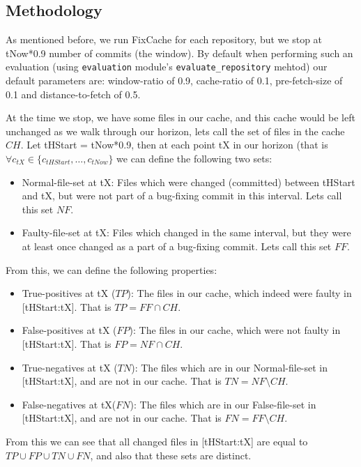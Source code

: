 \documentclass[12pt,twoside,notitlepage]{report}
\newcommand{\fxch}{FixCache}
\begin{document}
\subsection{Methodology}
As mentioned before, we run \fxch{} for each repository, but we stop at tNow*0.9 number of commits (the window). By default when performing such an evaluation (using \texttt{evaluation} module's \texttt{evaluate\_repository} mehtod) our default parameters are: window-ratio of 0.9, cache-ratio of 0.1, pre-fetch-size of 0.1 and distance-to-fetch of 0.5.

At the time we stop, we have some files in our cache, and this cache would be left unchanged as we walk through our horizon, lets call the set of files in the cache $CH$. Let tHStart = tNow*0.9, then at each point tX in our horizon (that is $\forall c_{tX} \in \{c_{tHStart}, \dots, c_{tNow}\}$ we can define the following two sets:
\begin{itemize}
\item Normal-file-set at tX: Files which were changed (committed) between tHStart and tX, but were not part of a bug-fixing commit in this interval. Lets call this set $NF$.
\item Faulty-file-set at tX: Files which changed in the same interval, but they were at least once changed as a part of a bug-fixing commit. Lets call this set $FF$.
\end{itemize}

From this, we can define the following properties:
\begin{itemize}
\item True-positives at tX ($TP$): The files in our cache, which indeed were faulty in [tHStart:tX]. That is $TP = FF \cap CH$.
\item False-positives at tX ($FP$): The files in our cache, which were not faulty in [tHStart:tX]. That is $FP = NF \cap CH$.
\item True-negatives at tX ($TN$): The files which are in our Normal-file-set in [tHStart:tX], and are not in our cache. That is $TN = NF \setminus CH$.
\item False-negatives at tX($FN$): The files which are in our False-file-set in [tHStart:tX], and are not in our cache. That is $FN = FF \setminus CH$.
\end{itemize}
From this we can see that all changed files in [tHStart:tX] are equal to $TP \cup FP \cup TN \cup FN$, and also that these sets are distinct.
\end{document}
